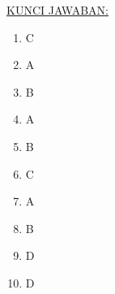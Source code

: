\documentclass[a4paper]{article}
\theoremstyle{definisi}
\numberwithin{equation}{section}
\begin{document}
  \underline{KUNCI JAWABAN:}
  \begin{enumerate}
    \item C
    \item A
    \item B
    \item A
    \item B
    \item C
    \item A
    \item B
    \item D
    \item D
  \end{enumerate}
\end{document}
